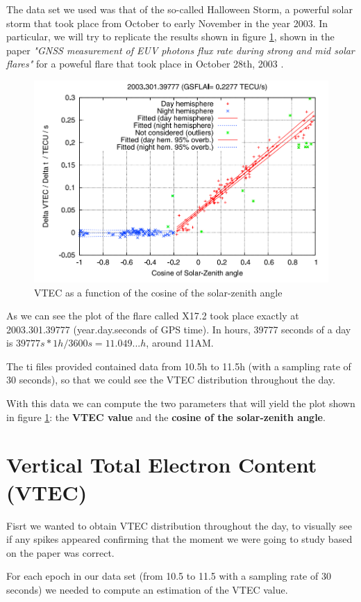 The data set we used was that of the so-called Halloween Storm, a powerful solar storm that took place from October to early November in the year 2003. In particular, we will try to replicate the results shown in figure \ref{fig:halloweenPaper}, shown in the paper \textit{"GNSS measurement of EUV photons flux rate during strong and mid solar flares"} for a poweful flare that took place in October 28th, 2003 \cite{hernandez2012gnss}.

\begin{figure}[!htb]
	\begin{centering}
		\includegraphics[width=0.5\linewidth]{images/ch4/halloweenPaper.png}
		\caption{VTEC as a function of the cosine of the solar-zenith angle}
		\label{fig:halloweenPaper}
	\end{centering}
\end{figure}

As we can see the plot of the flare called X17.2 took place exactly at 2003.301.39777 (year.day.seconds of GPS time). In hours, 39777 seconds of a day is $39777s * 1h/3600s = 11.049...h$, around 11AM. 

The ti files provided contained data from 10.5h to 11.5h (with a sampling rate of 30 seconds), so that we could see the VTEC distribution throughout the day.

With this data we can compute the two parameters that will yield the plot shown in figure \ref{fig:halloweenPaper}: the \textbf{VTEC value} and the \textbf{cosine of the solar-zenith angle}.

\section{Vertical Total Electron Content (VTEC)}

Fisrt we wanted to obtain VTEC distribution throughout the day, to visually see if any spikes appeared confirming that the moment we were going to study based on the paper was correct.

For each epoch in our data set (from 10.5 to 11.5 with a sampling rate of 30 seconds) we needed to compute an estimation of the VTEC value.

